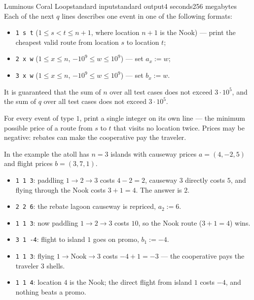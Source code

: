 \begin{problem}{Luminous Coral Loop}{standard input}{standard output}{4 seconds}{256 megabytes}
Each of the next $q$ lines describes one event in one of the following formats:
\begin{itemize}
\item \texttt{1 s t} ($1 \le s < t \le n+1$, where location $n+1$ is the Nook) --- print the cheapest valid route from location $s$ to location $t$;
\item \texttt{2 x w} ($1 \le x \le n$, $-10^9 \le w \le 10^9$) --- set $a_x := w$;
\item \texttt{3 x w} ($1 \le x \le n$, $-10^9 \le w \le 10^9$) --- set $b_x := w$.
\end{itemize}

It is guaranteed that the sum of $n$ over all test cases does not exceed $3 \cdot 10^5$, and the sum of $q$ over all test cases does not exceed $3 \cdot 10^5$.


\OutputFile
For every event of type $1$, print a single integer on its own line --- the minimum possible price of a route from $s$ to $t$ that visits no location twice. Prices may be negative: rebates can make the cooperative pay the traveler.


\Example

\begin{example}
%
\end{example}

\Note
In the example the atoll has $n = 3$ islands with causeway prices $a = (4, -2, 5)$ and flight prices $b = (3, 7, 1)$.

\begin{itemize}
\item \texttt{1 1 3}: paddling $1 \to 2 \to 3$ costs $4 - 2 = 2$, causeway $3$ directly costs $5$, and flying through the Nook costs $3 + 1 = 4$. The answer is $2$.
\item \texttt{2 2 6}: the rebate lagoon causeway is repriced, $a_2 := 6$.
\item \texttt{1 1 3}: now paddling $1 \to 2 \to 3$ costs $10$, so the Nook route ($3 + 1 = 4$) wins.
\item \texttt{3 1 -4}: flight to island $1$ goes on promo, $b_1 := -4$.
\item \texttt{1 1 3}: flying $1 \to \text{Nook} \to 3$ costs $-4 + 1 = -3$ --- the cooperative pays the traveler $3$ shells.
\item \texttt{1 1 4}: location $4$ is the Nook; the direct flight from island $1$ costs $-4$, and nothing beats a promo.
\end{itemize}


\end{problem}


